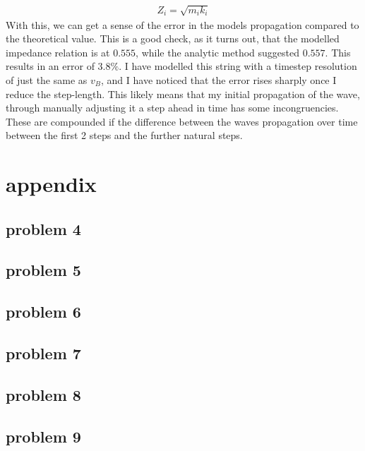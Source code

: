 \documentclass[12pt]{article}
\begin{document}
\begin{equation}
	\begin{aligned}
		Z_i = \sqrt{m_ik_i}
	\end{aligned}
\end{equation}
With this, we can get a sense of the error in the models propagation compared to the theoretical value. This is a good check, as it turns out, that the modelled impedance relation is at $0.555$, while the analytic method suggested $0.557$. This results in an error of $3.8\%$. I have modelled this string with a timestep resolution of just the same as $v_B$, and I have noticed that the error rises sharply once I reduce the step-length. This likely means that my initial propagation of the wave, through manually adjusting it a step ahead in time has some incongruencies. These are compounded if the difference between the waves propagation over time between the first 2 steps and the further natural steps. 

\newpage
\section*{appendix}
\newpage
	\subsection*{problem 4}
		
\newpage
	\subsection*{problem 5}
		
\newpage
	\subsection*{problem 6}
		
\newpage
	\subsection*{problem 7}
		
\newpage
	\subsection*{problem 8}
		
\newpage
	\subsection*{problem 9}
		
\end{document}
